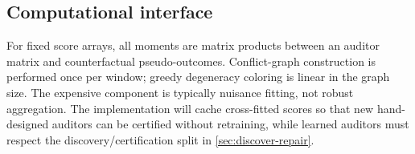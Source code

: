\subsection{Computational interface}
For fixed score arrays, all moments are matrix products between an auditor matrix and counterfactual pseudo-outcomes. Conflict-graph construction is performed once per window; greedy degeneracy coloring is linear in the graph size. The expensive component is typically nuisance fitting, not robust aggregation. The implementation will cache cross-fitted scores so that new hand-designed auditors can be certified without retraining, while learned auditors must respect the discovery/certification split in \cref{sec:discover-repair}.
